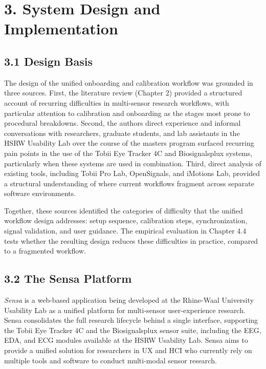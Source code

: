 \documentclass[
]{article}
\begin{document}
\clearpage
\hypertarget{system-design-and-implementation}{%
\section{3. System Design and Implementation}\label{system-design-and-implementation}}

\hypertarget{design-basis}{%
\subsection{\texorpdfstring{3.1 Design Basis }{3.1 Design Basis }}\label{design-basis}}

The design of the unified onboarding and calibration workflow was grounded in three sources. First, the literature review (Chapter 2) provided a structured account of recurring difficulties in multi-sensor research workflows, with particular attention to calibration and onboarding as the stages most prone to procedural breakdowns. Second, the author\textquotesingle s direct experience and informal conversations with researchers, graduate students, and lab assistants in the HSRW Usability Lab over the course of the master\textquotesingle s program surfaced recurring pain points in the use of the Tobii Eye Tracker 4C and Biosignalsplux systems, particularly when these systems are used in combination. Third, direct analysis of existing tools, including Tobii Pro Lab, OpenSignals, and iMotions Lab, provided a structural understanding of where current workflows fragment across separate software environments.

Together, these sources identified the categories of difficulty that the unified workflow design addresses: setup sequence, calibration steps, synchronization, signal validation, and user guidance. The empirical evaluation in Chapter 4.4 tests whether the resulting design reduces these difficulties in practice, compared to a fragmented workflow.

\hypertarget{the-sensa-platform}{%
\subsection{3.2 The Sensa Platform}\label{the-sensa-platform}}

\emph{Sensa} is a web-based application being developed at the Rhine-Waal University Usability Lab as a unified platform for multi-sensor user-experience research. Sensa consolidates the full research lifecycle behind a single interface, supporting the Tobii Eye Tracker 4C and the Biosignalsplux sensor suite, including the EEG, EDA, and ECG modules available at the HSRW Usability Lab. Sensa aims to provide a unified solution for researchers in UX and HCI who currently rely on multiple tools and software to conduct multi-modal sensor research.
\end{document}

